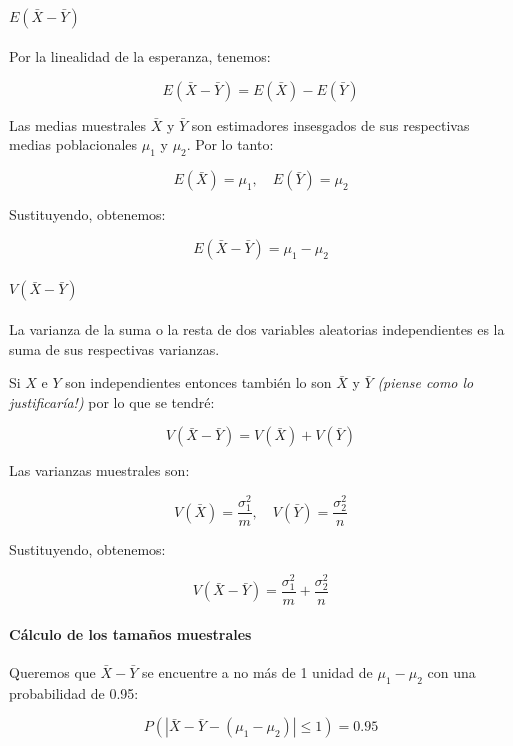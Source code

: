 \documentclass[
]{article}
\begin{document}
\paragraph{\texorpdfstring{\(E(\bar{X} - \bar{Y})\)}{E(\textbackslash bar\{X\} - \textbackslash bar\{Y\})}}\label{ebarx---bary}

Por la linealidad de la esperanza, tenemos:

\[
E(\bar{X} - \bar{Y}) = E(\bar{X}) - E(\bar{Y})
\]

Las medias muestrales \(\bar{X}\) y \(\bar{Y}\) son estimadores insesgados de sus respectivas medias poblacionales \(\mu_1\) y \(\mu_2\). Por lo tanto:

\[
E(\bar{X}) = \mu_1, \quad E(\bar{Y}) = \mu_2
\]

Sustituyendo, obtenemos:

\[
E(\bar{X} - \bar{Y}) = \mu_1 - \mu_2
\]

\paragraph{\texorpdfstring{\(V(\bar{X} - \bar{Y})\)}{V(\textbackslash bar\{X\} - \textbackslash bar\{Y\})}}\label{vbarx---bary}

La varianza de la suma o la resta de dos variables aleatorias independientes es la suma de sus respectivas varianzas.

Si \(X\) e \(Y\) son independientes entonces también lo son \(\bar{X}\) y \(\bar{Y}\) \emph{(piense como lo justificaría!)} por lo que se tendré:

\[
V(\bar{X} - \bar{Y}) = V(\bar{X}) + V(\bar{Y})
\]

Las varianzas muestrales son:

\[
V(\bar{X}) = \frac{\sigma_1^2}{m}, \quad V(\bar{Y}) = \frac{\sigma_2^2}{n}
\]

Sustituyendo, obtenemos:

\[
V(\bar{X} - \bar{Y}) = \frac{\sigma_1^2}{m} + \frac{\sigma_2^2}{n}
\]

\paragraph{Cálculo de los tamaños muestrales}\label{cuxe1lculo-de-los-tamauxf1os-muestrales}

Queremos que \(\bar{X} - \bar{Y}\) se encuentre a no más de 1 unidad de \(\mu_1 - \mu_2\) con una probabilidad de 0.95:

\[
P\left(\left|\bar{X} - \bar{Y} - (\mu_1 - \mu_2)\right| \leq 1\right) = 0.95
\]
\end{document}
